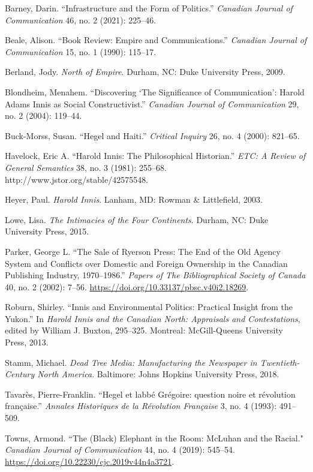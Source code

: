 \documentclass{tufte-handout}
\begin{document}
\begin{hangparas}{.25in}{1} 



Barney, Darin. ``Infrastructure and the Form of Politics.''
\emph{Canadian Journal of Communication} 46, no. 2 (2021): 225--46.

Beale, Alison. ``Book Review: Empire and Communications.''
\emph{Canadian Journal of Communication} 15, no. 1 (1990): 115--17.

Berland, Jody. \emph{North of Empire}. Durham, NC: Duke University
Press, 2009.

Blondheim, Menahem. ``Discovering `The Significance of Communication':
Harold Adams Innis as Social Constructivist.'' \emph{Canadian Journal of
Communication} 29, no. 2 (2004): 119--44.

Buck-Morss, Susan. ``Hegel and Haiti.'' \emph{Critical Inquiry} 26, no.
4 (2000): 821--65.

Havelock, Eric A. ``Harold Innis: The Philosophical Historian.''
\emph{ETC: A Review of General Semantics} 38, no. 3 (1981): 255--68.
http://www.jstor.org/stable/42575548.

Heyer, Paul. \emph{Harold Innis}. Lanham, MD: Rowman \& Littlefield,
2003.

Lowe, Lisa. \emph{The Intimacies of the Four Continents}. Durham, NC:
Duke University Press, 2015.

Parker, George L. ``The Sale of Ryerson Press: The End of the Old Agency
System and Conflicts over Domestic and Foreign Ownership in the Canadian
Publishing Industry, 1970--1986.'' \emph{Papers of The Bibliographical
Society of Canada} 40, no. 2 (2002): 7--56.
\url{https://doi.org/10.33137/pbsc.v40i2.18269}.

Roburn, Shirley. ``Innis and Environmental Politics: Practical Insight
from the Yukon.'' In \emph{Harold Innis and the Canadian North:
Appraisals and Contestations}, edited by William J. Buxton, 295--325.
Montreal: McGill-Queens University Press, 2013.

Stamm, Michael. \emph{Dead Tree Media: Manufacturing the Newspaper in
Twentieth-Century North America}. Baltimore: Johns Hopkins University
Press, 2018.

Tavarès, Pierre-Franklin. ``Hegel et l\textquotesingle abbé Grégoire:
question noire et révolution française.'' \emph{Annales Historiques de
la Révolution Française} 3, no. 4 (1993): 491--509.

Towns, Armond. ``The (Black) Elephant in the Room: McLuhan and the
Racial." \emph{Canadian Journal of Communication} 44, no. 4 (2019):
545--54. \url{https://doi.org/10.22230/cjc.2019v44n4a3721}.


\end{hangparas}
\end{document}
